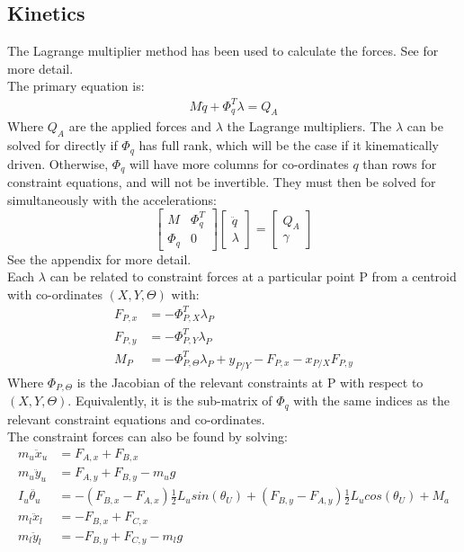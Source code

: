 \subsection{Kinetics}
The Lagrange multiplier method has been used to calculate the forces. See \cite{Schilder2018} for more detail.\\

The primary equation is:
\begin{eqnarray}
M\ddot{q}+\Phi_q^T\lambda=Q_A \label{eq:lambda}
\end{eqnarray}
Where $Q_A$ are the applied forces and $\lambda$ the Lagrange multipliers. The $\lambda$ can be solved for directly if $\Phi_q$ has full rank, which will be the case if it kinematically driven. Otherwise, $\Phi_q$ will have more columns for co-ordinates $q$ than rows for constraint equations, and will not be invertible. They must then be solved for simultaneously with the accelerations:
\begin{equation}
\begin{bmatrix}
M &\Phi_q^T \\
\Phi_q &0
\end{bmatrix}
\begin{bmatrix}
\ddot{q} \\
\lambda
\end{bmatrix}
=
\begin{bmatrix}
Q_A \\
\gamma
\end{bmatrix} \label{eq:EoM}
\end{equation}
See the appendix for more detail.\\

Each $\lambda$ can be related to constraint forces at a particular point P from a centroid with co-ordinates $(X,Y,\Theta)$ with:
\begin{equation}
\begin{aligned}
F_{P,x}&=-\Phi_{P,X}^T\lambda_P \\
F_{P,y}&=-\Phi_{P,Y}^T\lambda_P \\
M_P    &=-\Phi_{P,\Theta}^T\lambda_P+y_{P/Y}-F_{P,x}-x_{P/X}F_{P,y}
\end{aligned}
\end{equation}
Where $\Phi_{P,\Theta}$ is the Jacobian of the relevant constraints at P with respect to $(X,Y,\Theta)$. Equivalently, it is the sub-matrix of $\Phi_q$ with the same indices as the relevant constraint equations and co-ordinates.\\

The constraint forces can also be found by solving:
\begin{equation}
\begin{aligned}
m_u \ddot{x}_u &= F_{A,x}+F_{B,x} \\ 
m_u \ddot{y}_u &= F_{A,y}+F_{B,y} -m_u g \\
I_u \ddot{\theta_u}&=-(F_{B,x}-F_{A,x})\tfrac{1}{2}L_usin(\theta_U)+(F_{B,y}-F_{A,y})\tfrac{1}{2}L_ucos(\theta_U)+M_a\\
m_l \ddot{x}_l &= -F_{B,x}+F_{C,x} \\ 
m_l \ddot{y}_l &= -F_{B,y}+F_{C,y} -m_l g\\
\end{aligned}
\end{equation}


